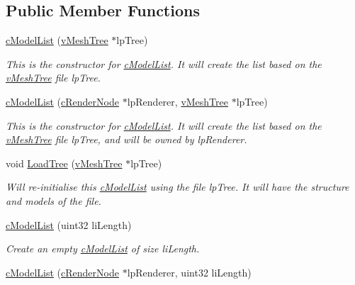 \subsection*{Public Member Functions}
\begin{DoxyCompactItemize}
\item 
\hyperlink{classc_model_list_aa930702d1e9aca8d03cd4bdd49ce7736}{cModelList} (\hyperlink{classv_mesh_tree}{vMeshTree} $\ast$lpTree)
\begin{DoxyCompactList}\small\item\em This is the constructor for \hyperlink{classc_model_list}{cModelList}. It will create the list based on the \hyperlink{classv_mesh_tree}{vMeshTree} file lpTree. \item\end{DoxyCompactList}\item 
\hyperlink{classc_model_list_ac79660e5fc593d56a05b3d6a6b7e8d49}{cModelList} (\hyperlink{classc_render_node}{cRenderNode} $\ast$lpRenderer, \hyperlink{classv_mesh_tree}{vMeshTree} $\ast$lpTree)
\begin{DoxyCompactList}\small\item\em This is the constructor for \hyperlink{classc_model_list}{cModelList}. It will create the list based on the \hyperlink{classv_mesh_tree}{vMeshTree} file lpTree, and will be owned by lpRenderer. \item\end{DoxyCompactList}\item 
void \hyperlink{classc_model_list_ab0a529e10390da1c013fdc657238c6fa}{LoadTree} (\hyperlink{classv_mesh_tree}{vMeshTree} $\ast$lpTree)
\begin{DoxyCompactList}\small\item\em Will re-\/initialise this \hyperlink{classc_model_list}{cModelList} using the file lpTree. It will have the structure and models of the file. \item\end{DoxyCompactList}\item 
\hyperlink{classc_model_list_a9462e9a51ad43c105ce4cf715c9de432}{cModelList} (uint32 liLength)
\begin{DoxyCompactList}\small\item\em Create an empty \hyperlink{classc_model_list}{cModelList} of size liLength. \item\end{DoxyCompactList}\item 
\hyperlink{classc_model_list_a78b5eb0ca13441e18c0bcb7a37f6c272}{cModelList} (\hyperlink{classc_render_node}{cRenderNode} $\ast$lpRenderer, uint32 liLength)

\end{DoxyCompactItemize}
